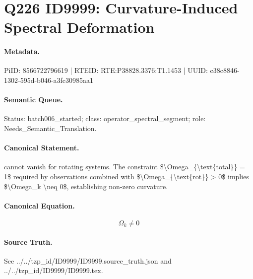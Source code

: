 \section*{Q226 ID9999: Curvature-Induced Spectral Deformation}
\paragraph{Metadata.}
PiID: 8566722796619 | RTEID: RTE:P38828.3376:T1.1453 | UUID: c38c8846-1302-595d-b046-a3fc30985aa1

\paragraph{Semantic Queue.}
Status: batch006\_started; class: operator\_spectral\_segment; role: Needs\_Semantic\_Translation.

\paragraph{Canonical Statement.}
cannot vanish for rotating systems. The constraint \$\textbackslash{}Omega\_\{\textbackslash{}text\{total\}\} = 1\$ required by observations combined with \$\textbackslash{}Omega\_\{\textbackslash{}text\{rot\}\} > 0\$ implies \$\textbackslash{}Omega\_k \textbackslash{}neq 0\$, establishing non-zero curvature.

\paragraph{Canonical Equation.}
\[
\Omega_k \neq 0
\]

\paragraph{Source Truth.}
See ../../tzp\_id/ID9999/ID9999.source\_truth.json and ../../tzp\_id/ID9999/ID9999.tex.
